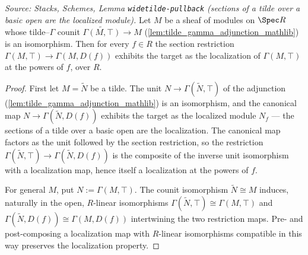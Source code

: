 \begin{lemma}
  \label{lem:isLocalizedModule_restrict_of_isIso_fromTildeΓ}
  \leanok
  \textit{Source: Stacks, Schemes, Lemma \texttt{widetilde-pullback} (sections of a
  tilde over a basic open are the localized module).}
  Let \(M\) be a sheaf of modules on \(\Spec R\) whose tilde--\(\Gamma\) counit
  \(\widetilde{\Gamma(M, \top)} \to M\) (\cref{lem:tilde_gamma_adjunction_mathlib}) is an
  isomorphism. Then for every \(f \in R\) the section restriction
  \(\Gamma(M, \top) \to \Gamma(M, D(f))\) exhibits the target as the localization of
  \(\Gamma(M, \top)\) at the powers of \(f\), over \(R\).
\end{lemma}
\begin{proof}
  \leanok
  First let \(M = \widetilde{N}\) be a tilde. The unit
  \(N \to \Gamma(\widetilde{N}, \top)\) of the adjunction
  (\cref{lem:tilde_gamma_adjunction_mathlib}) is an isomorphism, and the canonical map
  \(N \to \Gamma(\widetilde{N}, D(f))\) exhibits the target as the localized module
  \(N_f\) — the sections of a tilde over a basic open are the localization. The
  canonical map factors as the unit followed by the section restriction, so the
  restriction \(\Gamma(\widetilde{N}, \top) \to \Gamma(\widetilde{N}, D(f))\) is the
  composite of the inverse unit isomorphism with a localization map, hence itself a
  localization at the powers of \(f\).

  For general \(M\), put \(N := \Gamma(M, \top)\). The counit isomorphism
  \(\widetilde{N} \cong M\) induces, naturally in the open, \(R\)-linear isomorphisms
  \(\Gamma(\widetilde{N}, \top) \cong \Gamma(M, \top)\) and
  \(\Gamma(\widetilde{N}, D(f)) \cong \Gamma(M, D(f))\) intertwining the two restriction
  maps. Pre- and post-composing a localization map with \(R\)-linear isomorphisms
  compatible in this way preserves the localization property.
\end{proof}

